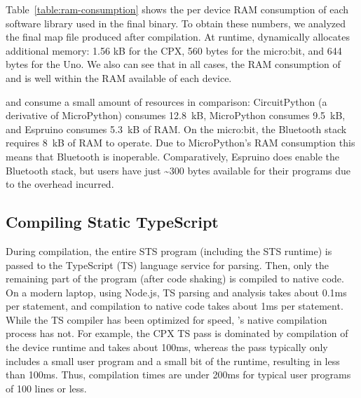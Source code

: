 Table~\ref{table:ram-consumption} shows the per device RAM consumption of each software library used in the final \MC binary. To obtain these numbers, we analyzed the final map file produced after compilation. At runtime, \MC dynamically allocates additional memory: 1.56 kB for the CPX, 560 bytes for the micro:bit, and 644 bytes for the Uno. We also can see that in all cases, the RAM consumption of \MC and \CO is well within the RAM available of each device.

\MC and \CO consume a small amount of resources in comparison: CircuitPython (a derivative of MicroPython) consumes 12.8~kB, MicroPython consumes 9.5~kB, and Espruino consumes 5.3~kB of RAM. On the micro:bit, the Bluetooth stack requires 8~kB of RAM to operate. Due to MicroPython's RAM consumption this means that Bluetooth is inoperable. Comparatively, Espruino does enable the Bluetooth stack, but users have just \textasciitilde300 bytes available for their programs due to the overhead incurred.





\subsection{Compiling Static TypeScript}

During compilation, the entire STS program (including the STS runtime) is passed to the TypeScript (TS) language service for parsing. Then, only the remaining part of the program (after code shaking) is compiled to native code. On a modern laptop, using Node.js, TS parsing and analysis takes about 0.1ms per statement, and \MC compilation to native code takes about 1ms per statement.
While the TS compiler has been optimized for speed, \MCN's native compilation process has not. For example, the CPX TS pass is dominated by compilation of the device runtime and takes about 100ms, whereas the \MC pass typically only includes a small user program and a small bit of the runtime, resulting in less than 100ms. Thus, compilation times are under 200ms for typical user programs of 100 lines or less.

